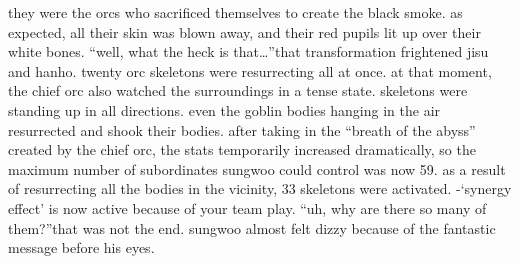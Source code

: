  they were the orcs who sacrificed themselves to create the black smoke.
as expected, all their skin was blown away, and their red pupils lit up over their white bones.
“well, what the heck is that…”that transformation frightened jisu and hanho.
 twenty orc skeletons were resurrecting all at once.
at that moment, the chief orc also watched the surroundings in a tense state.
skeletons were standing up in all directions.
 even the goblin bodies hanging in the air resurrected and shook their bodies.
after taking in the “breath of the abyss” created by the chief orc, the stats temporarily increased dramatically, so the maximum number of subordinates sungwoo could control was now 59.
as a result of resurrecting all the bodies in the vicinity, 33 skeletons were activated.
-‘synergy effect’ is now active because of your team play.
“uh, why are there so many of them?”that was not the end.
sungwoo almost felt dizzy because of the fantastic message before his eyes.

